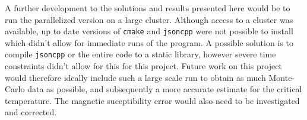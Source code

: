 \documentclass[aps,reprint]{revtex4-1}
\newcommand\blankpage{%
  \null
  \thispagestyle{empty}%
  \addtocounter{page}{-1}%
  \newpage}
\begin{document}
A further development to the solutions and results presented here would be to
run the parallelized version on a large cluster. Although access to a cluster
was available, up to date versions of \texttt{cmake} and \texttt{jsoncpp} were not possible to install
which didn't allow for immediate runs of the program. A possible solution is to
compile \texttt{jsoncpp} or the entire code to a static library, however severe
time constraints didn't allow for this for this project. Future work on this
project would therefore ideally include such a large scale run to obtain as much
Monte-Carlo data as possible, and subsequently a more accurate estimate for the
critical temperature. The magnetic suceptibility error would also need to be
investigated and corrected.

\blankpage
\end{document}
